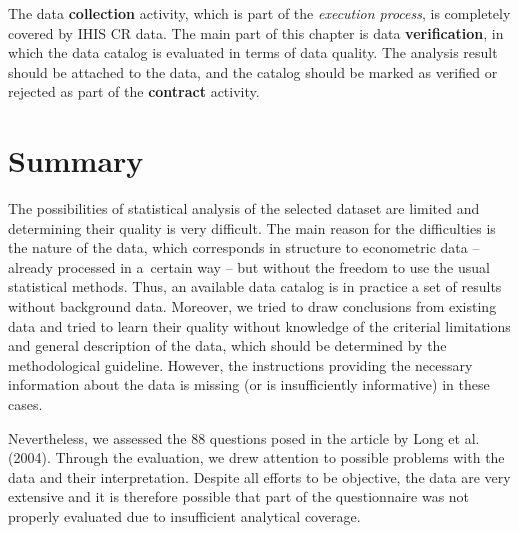 The data \textbf{collection} activity, which is part of the \textit{execution process}, is completely covered by IHIS CR data.
The main part of this chapter is data \textbf{verification}, in which the data catalog is evaluated in terms of data quality.
The analysis result should be attached to the data, and the catalog should be marked as verified or rejected as part of the \textbf{contract} activity.

\section{Summary}

The possibilities of statistical analysis of the selected dataset are limited and determining their quality is very difficult.
The main reason for the difficulties is the nature of the data, which corresponds in structure to econometric data – already processed in a~certain way – but without the freedom to use the usual statistical methods.
Thus, an available data catalog is in practice a set of results without background data.
Moreover, we tried to draw conclusions from existing data and tried to learn their quality without knowledge of the criterial limitations and general description of the data, which should be determined by the methodological guideline.
However, the instructions providing the necessary information about the data is missing (or is insufficiently informative) in these cases.

Nevertheless, we assessed the 88 questions posed in the article by Long et al. (2004).
Through the evaluation, we drew attention to possible problems with the data and their interpretation.
Despite all efforts to be objective, the data are very extensive and it is therefore possible that part of the questionnaire was not properly evaluated due to insufficient analytical coverage.


